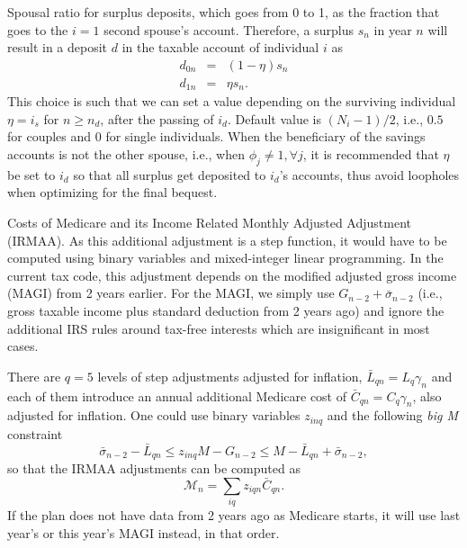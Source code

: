 \documentclass{report}[fleqn,12pt]
\begin{document}
\begin{description}[leftmargin=4em,style=multiline]
\item [$\eta$]
	Spousal ratio for surplus deposits, which goes from 0 to 1, as the fraction
	that goes to the $i = 1$ second spouse's account. Therefore, a surplus $s_n$ in year $n$
	will result in a deposit $d$ in the taxable account of individual $i$ as
	\begin{eqnarray}
		\label{Eq:eta}
		d_{0n} & = & (1 - \eta) s_n \nonumber\\
		d_{1n} & = & \eta s_n.
	\end{eqnarray}
	This choice is such that we can set a value depending on the surviving
	individual $\eta = i_s$ for $n \ge n_d$, after the passing of $i_d$.
	Default value is $(N_i - 1)/2$, i.e., $0.5$ for couples and $0$ for single individuals.
	When the beneficiary of the savings accounts is not the other spouse, i.e., 
	when $\phi_j \neq 1, \forall j$, it is recommended that $\eta$ be set to $i_d$ so that
	all surplus get deposited to $i_d$'s accounts,
	thus avoid loopholes when optimizing for the final bequest.
\item [$\mathcal{M}_n$]
	Costs of Medicare and its Income Related Monthly Adjusted Adjustment (IRMAA).
	As this additional adjustment
	is a step function, it would have to be computed using binary variables and mixed-integer linear
	programming. In the current tax code, this adjustment
	depends on the modified adjusted gross income (MAGI) from 2 years earlier. For the
	MAGI, we simply use $G_{n-2} + \bar{\sigma}_{n-2}$ (i.e., gross taxable income
	plus standard deduction from 2 years ago) and ignore the additional IRS
	rules around tax-free interests which are insignificant in most cases.

	There are $q=5$ levels
	of step adjustments adjusted for inflation,
	$\bar{L}_{qn} = L_q\gamma_n$ and each of them introduce
	an annual additional Medicare
	cost of $\bar{C}_{qn} = C_q\gamma_n$, also adjusted for inflation.
	One could use binary variables $z_{inq}$ and the following {\em big M} constraint
	\begin{equation}
		\bar{\sigma}_{n-2} -\bar{L}_{qn} \le z_{inq} M - G_{n-2}
		 \le M - \bar{L}_{qn} + \bar{\sigma}_{n-2},
	\end{equation}
	so that the IRMAA adjustments can be computed as
	\begin{equation}
		\label{Eq:IRMAA}
		\mathcal{M}_n = \sum_{iq} z_{iqn} \bar{C}_{qn}.
	\end{equation}
	If the plan does not have data from 2 years ago as Medicare starts,
	it will use last year's or this year's MAGI instead, in that order.


\end{description}
\end{document}
